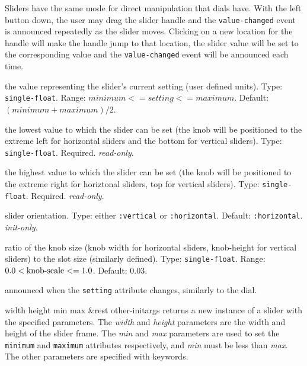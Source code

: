 \documentclass[twoside,openright,11pt]{report}
\newcommand{\tp}[1]{\texttt{#1}}
\begin{document}
Sliders have the same mode for direct manipulation that dials have.
With the left button down, the user may drag the slider handle and the
\tp{value-changed} event is announced repeatedly as the slider moves.
Clicking on a new location for the handle will make the handle jump to
that location, the slider value will be set to the corresponding value
and the \tp{value-changed} event will be announced each time.


{the value representing the slider's current setting (user defined
units).  Type: \tp{single-float}.  Range: \(minimum <=
setting <= maximum\).  Default: \((minimum + maximum) / 2\).}

{the lowest value to which the slider can be set (the knob will be
positioned to the extreme left for horizontal sliders and the bottom
for vertical sliders).  Type: \tp{single-float}.  Required.
\textit{read-only}.}

{the highest value to which the slider can be set (the knob will be
positioned to the extreme right for horiztonal sliders, top for
vertical sliders).  Type: \tp{single-float}.  Required.
\textit{read-only}.}

{slider orientation.  Type: either \tp{:vertical} or \tp{:horizontal}.
Default: \tp{:horizontal}.  \textit{init-only}.}

{ratio of the knob size (knob width for horizontal sliders,
knob-height for vertical sliders) to the slot size (similarly
defined).  Type: \tp{single-float}.
Range: \(0.0 < \textmd{knob-scale} <= 1.0\).  Default: 0.03.}


{announced when the \tp{setting} attribute changes, similarly to
the dial.}


{width height min max \&rest other-initargs}
{returns a new instance of a slider with the specified parameters.
The \emph{width} and \emph{height} parameters are the width and height
of the slider frame.  The \emph{min} and \emph{max} parameters are
used to set the \tp{minimum} and \tp{maximum} attributes respectively,
and \emph{min} must be less than \emph{max}.  The other parameters are
specified with keywords.}
\end{document}

